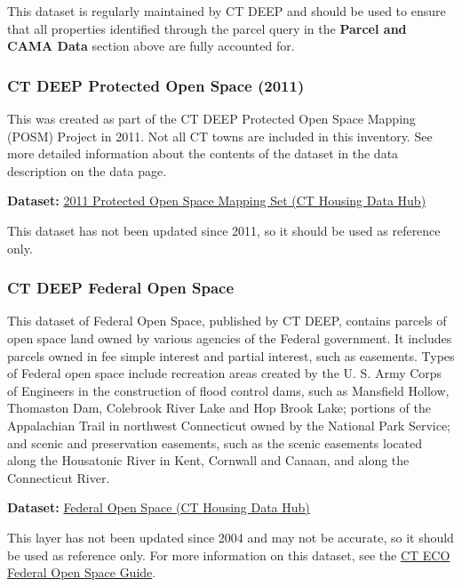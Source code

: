 \documentclass[
  letterpaper,
  DIV=11,
  numbers=noendperiod]{scrreprt}
\begin{document}
This dataset is regularly maintained by CT DEEP and should be used to
ensure that all properties identified through the parcel query in the
\textbf{Parcel and CAMA Data} section above are fully accounted for.

\subsubsection{CT DEEP Protected Open Space
(2011)}\label{sec-ct-deep-protected-open-space-2011}

This was created as part of the CT DEEP Protected Open Space Mapping
(POSM) Project in 2011. Not all CT towns are included in this inventory.
See more detailed information about the contents of the dataset in the
data description on the data page.

\textbf{Dataset:}
\href{https://housingmaps.ct.gov/maps/80c5e61b6e86423d9089350785e709a3/about}{2011
Protected Open Space Mapping Set (CT Housing Data Hub)}

This dataset has not been updated since 2011, so it should be used as
reference only.

\subsubsection{CT DEEP Federal Open
Space}\label{sec-ct-deep-federal-open-space}

This dataset of Federal Open Space, published by CT DEEP, contains
parcels of open space land owned by various agencies of the Federal
government. It includes parcels owned in fee simple interest and partial
interest, such as easements. Types of Federal open space include
recreation areas created by the U. S. Army Corps of Engineers in the
construction of flood control dams, such as Mansfield Hollow, Thomaston
Dam, Colebrook River Lake and Hop Brook Lake; portions of the
Appalachian Trail in northwest Connecticut owned by the National Park
Service; and scenic and preservation easements, such as the scenic
easements located along the Housatonic River in Kent, Cornwall and
Canaan, and along the Connecticut River.

\textbf{Dataset:}
\href{https://housingmaps.ct.gov/datasets/CTDEEP::federal-open-space/about}{Federal
Open Space (CT Housing Data Hub)}

This layer has not been updated since 2004 and may not be accurate, so
it should be used as reference only. For more information on this
dataset, see the
\href{https://cteco.uconn.edu/guides/Federal_Open_Space.htm}{CT ECO
Federal Open Space Guide}.
\end{document}

